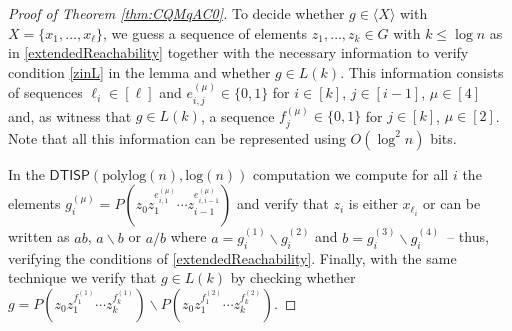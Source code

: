 \documentclass{theoretics}
\newcommand*{\ComplexityClass}[1]{\ensuremath{\mathsf{#1}}\xspace}
\newcommand{\DTISP}{\ComplexityClass{DTISP}}
\newcommand{\DTISPpll}{\ensuremath{\DTISP(\mathrm{polylog}(n),\mathrm{log}(n))}\xspace}
\begin{document}
\begin{proof}[Proof of Theorem \ref{thm:CQMqAC0}]
    To decide whether $g \in \langle X \rangle$ with $X = \{x_1, \dots, x_\ell\}$, we guess a sequence of elements $z_1, \dots, z_k \in G$ with $k \leq \log n$ as in \cref{extendedReachability} together with the necessary information to verify condition \ref{zinL} in the lemma and whether $g \in L(k)$. This information consists of sequences $\ell_i \in [\ell]$ and $e_{i,j}^{(\mu)}\in \{0,1\}$ for $i \in [k]$, $j\in [i-1]$, $\mu \in [4]$ and, as witness that $g \in L(k)$, a sequence $f_j^{(\mu)}\in \{0,1\}$ for $j\in [k]$, $\mu \in [2]$. Note that all this information can be represented using $O(\log^2n)$ bits. 


    In the \DTISPpll computation we compute for all $i$ the elements $g_i^{(\mu)} = P(z_0z_{1}^{e_{i,1}^{(\mu)}} \cdots z_{i-1}^{e_{i,i-1}^{(\mu)}})$ and verify that $z_i $ is either $x_{\ell_i}$ or can be written as $ab$, $a\backslash b$ or $a/b$ where $a = g_i^{(1)} \backslash g_i^{(2)}$ and $b = g_i^{(3)} \backslash g_i^{(4)}$~-- thus, verifying the conditions of \cref{extendedReachability}. Finally, with the same technique we verify that $g\in L(k)$ by checking whether $g = P(z_0z_{1}^{f_{1}^{(1)}} \cdots z_{k}^{f_{k}^{(1)}})  \backslash P(z_0z_{1}^{f_{1}^{(2)}} \cdots z_{k}^{f_{k}^{(2)}}) $.
\end{proof}
\end{document}
